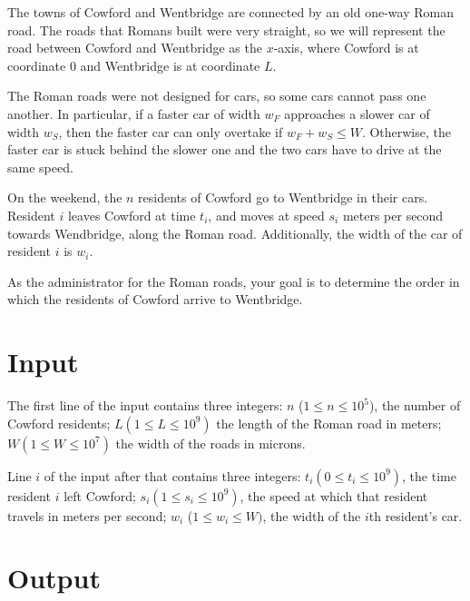 
The towns of Cowford and Wentbridge are connected by an old one-way Roman road.
The roads that Romans built were very straight, so we will represent the road between Cowford and Wentbridge as the $x$-axis, where Cowford is at coordinate $0$ and Wentbridge is at coordinate $L$.

The Roman roads were not designed for cars, so some cars cannot pass one another.
In particular, if a faster car of width $w_F$ approaches a slower car of width $w_S$, then the faster car can only overtake if $w_F + w_S \leq W$.
Otherwise, the faster car is stuck behind the slower one and the two cars have to drive at the same speed.

On the weekend, the $n$ residents of Cowford go to Wentbridge in their cars.
Resident $i$ leaves Cowford at time $t_i$, and moves at speed $s_i$ meters per second towards Wendbridge, along the Roman road.
Additionally, the width of the car of resident $i$ is $w_i$.

As the administrator for the Roman roads, your goal is to determine the order in which the residents of Cowford arrive to Wentbridge.

\section*{Input}
The first line of the input contains three integers: $n$ ($1 \leq n \leq 10^5$), the number of Cowford residents; $L (1 \leq L \leq 10^9)$ the length of the Roman road in meters; $W (1 \leq W \leq 10^7)$ the width of the roads in microns.

Line $i$ of the input after that contains three integers: $t_i (0 \leq t_i \leq 10^9)$, the time resident $i$ left Cowford; $s_i (1 \leq s_i \leq 10^9)$, the speed at which that resident travels in meters per second; $w_i$ ($1 \leq w_i \leq W)$, the width of the $i$th resident's car.

\section*{Output}
